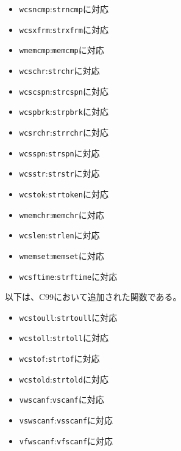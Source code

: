\begin{multicols}{2}
\begin{itemize}
\item \verb|wcsncmp|:\verb|strncmp|に対応
\item \verb|wcsxfrm|:\verb|strxfrm|に対応
\item \verb|wmemcmp|:\verb|memcmp|に対応
\item \verb|wcschr|:\verb|strchr|に対応
\item \verb|wcscspn|:\verb|strcspn|に対応
\item \verb|wcspbrk|:\verb|strpbrk|に対応
\item \verb|wcsrchr|:\verb|strrchr|に対応
\item \verb|wcsspn|:\verb|strspn|に対応
\item \verb|wcsstr|:\verb|strstr|に対応
\item \verb|wcstok|:\verb|strtoken|に対応
\item \verb|wmemchr|:\verb|memchr|に対応
\item \verb|wcslen|:\verb|strlen|に対応
\item \verb|wmemset|:\verb|memset|に対応
\item \verb|wcsftime|:\verb|strftime|に対応
\end{itemize}
\end{multicols}
以下は、C99において追加された関数である。
\begin{multicols}{2}
\begin{itemize}
\item \verb|wcstoull|:\verb|strtoull|に対応
\item \verb|wcstoll|:\verb|strtoll|に対応
\item \verb|wcstof|:\verb|strtof|に対応
\item \verb|wcstold|:\verb|strtold|に対応
\item \verb|vwscanf|:\verb|vscanf|に対応
\item \verb|vswscanf|:\verb|vsscanf|に対応
\item \verb|vfwscanf|:\verb|vfscanf|に対応
\end{itemize}
\end{multicols}

